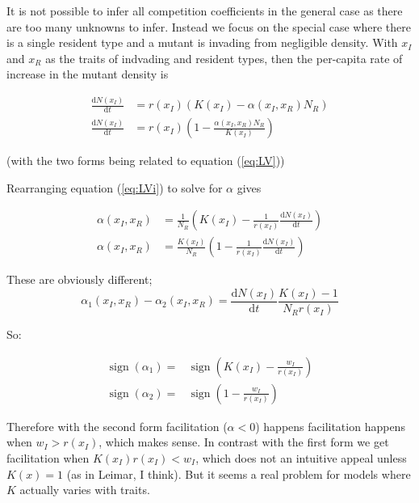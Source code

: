 \documentclass[a4paper,11pt]{article}
\newcommand{\ud}{\ensuremath{\mathrm{d}}}
\newcommand{\sign}{\mathop{\mathrm{sign}}\nolimits}
\begin{document}
It is not possible to infer all competition coefficients in the
general case as there are too many unknowns to infer.  Instead we
focus on the special case where there is a single resident type and a
mutant is invading from negligible density.  With $x_I$ and $x_R$ as
the traits of indvading and resident types, then the per-capita rate
of increase in the mutant density is

\begin{subequations}
  \label{eq:LVi}
  \begin{align}
    \frac{\ud N(x_I)}{\ud t} &=
    r(x_I)\left(K(x_I) - \alpha(x_I, x_R) N_R\right)\\
    \frac{\ud N(x_I)}{\ud t} &=
    r(x_I)\left(1 - \frac{\alpha(x_I, x_R) N_R}{K(x_I)}\right)
  \end{align}
\end{subequations}

(with the two forms being related to equation (\ref{eq:LV}))

Rearranging equation (\ref{eq:LVi}) to solve for $\alpha$ gives

\begin{subequations}
  \begin{align}
    \alpha(x_I, x_R) &= \frac{1}{N_R}
    \left(K(x_I) - \frac{1}{r(x_I)}\frac{\ud N(x_I)}{\ud t}\right)\\
    \alpha(x_I, x_R) &= \frac{K(x_I)}{N_R}
    \left(1 - \frac{1}{r(x_I)}\frac{\ud N(x_I)}{\ud t}\right)
  \end{align}
\end{subequations}

These are obviously different;
\begin{equation*}
  \alpha_1(x_I, x_R) - \alpha_2(x_I, x_R) =
  \frac{\ud N(x_I)}{\ud t} \frac{K(x_I) - 1}{N_R r(x_I)}
\end{equation*}

So:

\begin{align*}
  \sign(\alpha_1) =& \sign\left(K(x_I) - \frac{w_I}{r(x_I)}\right)\\
  \sign(\alpha_2) =& \sign\left(1 - \frac{w_I}{r(x_I)}\right)
\end{align*}

Therefore with the second form facilitation ($\alpha < 0$) happens
facilitation happens when $w_I > r(x_I)$, which makes sense.  In
contrast with the first form we get facilitation when $K(x_I) r(x_I) <
w_I$, which does not an intuitive appeal unless $K(x) = 1$ (as in
Leimar, I think).  But it seems a real problem for models where $K$
actually varies with traits.
\end{document}
